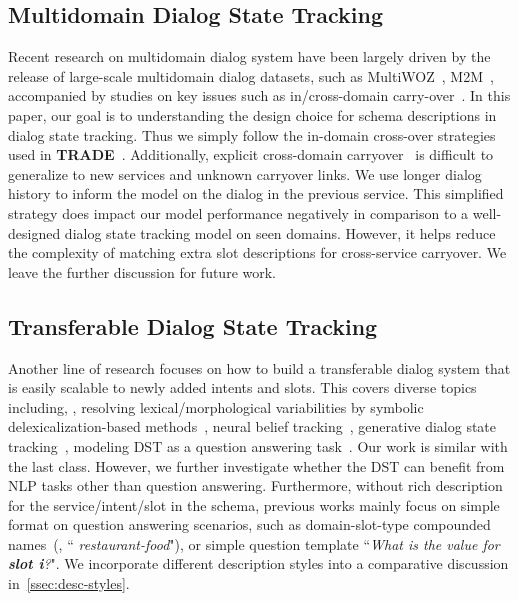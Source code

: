 \subsection{Multidomain Dialog State Tracking}
\label{ssec:sgd:multidomain}
Recent research on multidomain dialog system have been largely driven
by the release of large-scale multidomain dialog datasets, such as
MultiWOZ~\citep{budzianowski2018multiwoz},
M2M~\citep{shah-etal-2018-bootstrapping}, accompanied by studies on key
issues such as in/cross-domain carry-over~\citep{ kim2019efficient}. In
this paper, our goal is to understanding the design choice for schema
descriptions in dialog state tracking.  Thus we simply follow the
in-domain cross-over strategies used in {\bf
  TRADE}~\citep{wu2019transferable}. Additionally, explicit
cross-domain carryover~\citep{naik2018contextual} is difficult to
generalize to new services and unknown carryover links. We use longer
dialog history to inform the model on the dialog in the previous
service. This simplified strategy does impact our model performance
negatively in comparison to a well-designed dialog state tracking
model on seen domains. However, it helps reduce the complexity of
matching extra slot descriptions for cross-service carryover. We leave
the further discussion for future work.

\subsection{Transferable Dialog State Tracking}
\label{ssec:sgd:transfer-dialogue}
Another line of research focuses on how to build a transferable dialog
system that is easily scalable to newly added intents and slots. This
covers diverse topics including, \eg, resolving lexical/morphological
variabilities by symbolic delexicalization-based
methods~\citep{henderson2014word, williams2016dialog}, neural belief
tracking~\citep{mrkvsic2017neural}, generative dialog state
tracking~\citep{peng2020soloist, hosseini2020simple}, modeling DST as a
question answering task~\citep{zhang2019find, lee2019sumbt,
  gao2020machine, gao2019dialog}. Our work is similar with the last
class. However, we further investigate whether the DST can benefit
from NLP tasks other than question answering. Furthermore, without
rich description for the service/intent/slot in the schema, previous
works mainly focus on simple format on question answering scenarios,
such as domain-slot-type compounded names~(\eg, ``{\it
  restaurant-food}"), or simple question template ``{\it What is the
  value for {\bf slot i}?}". We incorporate different description
styles into a comparative discussion in~\autoref{ssec:desc-styles}.

